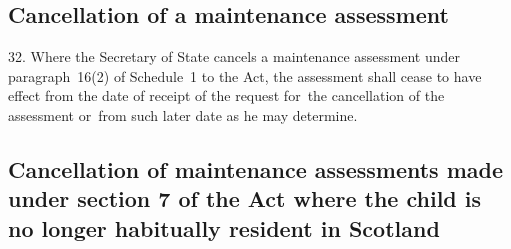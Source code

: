 \documentclass[a4paper,12pt]{article}
\begin{document}
%
%
%
%

\subsection[32. Cancellation of a maintenance assessment]{Cancellation of a maintenance assessment}

32.  Where 
the Secretary of State  %
cancels a maintenance assessment under paragraph~16(2) 
of Schedule~1 to the Act, the assessment shall cease to have effect from the date of receipt of the request for~the cancellation of the assessment or~from such later date as 
he  %
may determine.


\subsection[32A. Cancellation of maintenance assessments made under section 7 of the Act where the child is no longer habitually resident in Scotland]{Cancellation of maintenance assessments made under section 7 of the Act where the child is no longer habitually resident in Scotland}
\end{document}
